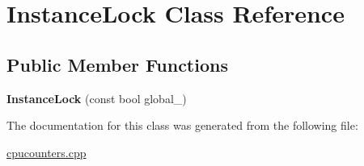 \hypertarget{class_instance_lock}{}\section{Instance\+Lock Class Reference}
\label{class_instance_lock}
\subsection*{Public Member Functions}
\begin{DoxyCompactItemize}
\item 
\mbox{\label{class_instance_lock_a9fa936c0a79760e8fe4e93a7bee72cb1}} 
{\bfseries Instance\+Lock} (const bool global\+\_\+)
\end{DoxyCompactItemize}


The documentation for this class was generated from the following file\+:\begin{DoxyCompactItemize}
\item 
\mbox{\hyperlink{cpucounters_8cpp}{cpucounters.\+cpp}}\end{DoxyCompactItemize}
